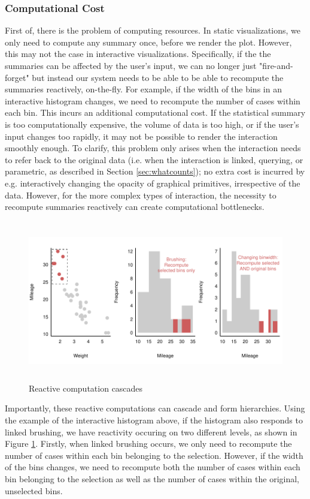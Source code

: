 \documentclass[12pt,a4paper]{article}
\begin{document}
\subsubsection{Computational Cost}

First of, there is the problem of computing resources. In static visualizations, we only need to compute any summary once, before we render the plot. However, this may not the case in interactive visualizations. Specifically, if the the summaries can be affected by the user's input, we can no longer just "fire-and-forget" but instead our system needs to be able to be able to recompute the summaries reactively, on-the-fly. For example, if the width of the bins in an interactive histogram changes, we need to recompute the number of cases within each bin. This incurs an additional computational cost. If the statistical summary is too computationally expensive, the volume of data is too high, or if the user's input changes too rapidly, it may not be possible to render the interaction smoothly enough. To clarify, this problem only arises when the interaction needs to refer back to the original data (i.e. when the interaction is linked, querying, or parametric, as described in Section \ref{sec:whatcounts}); no extra cost is incurred by e.g. interactively changing the opacity of graphical primitives, irrespective of the data. However, for the more complex types of interaction, the necessity to recompute summaries reactively can create computational bottlenecks.   

\begin{figure}[H]
\centering
\includegraphics[height=70mm]{./figure03.pdf}
\caption{Reactive computation cascades}
\label{fig:reactivecascade}
\end{figure}

Importantly, these reactive computations can cascade and form hierarchies. Using the example of the interactive histogram above, if the histogram also responds to linked brushing, we have reactivity occuring on two different levels, as shown in Figure \ref{fig:reactivecascade}. Firstly, when linked brushing occurs, we only need to recompute the number of cases within each bin belonging to the selection. However, if the width of the bins changes, we need to recompute both the number of cases within each bin belonging to the selection as well as the number of cases within the original, unselected bins.    
\end{document}

